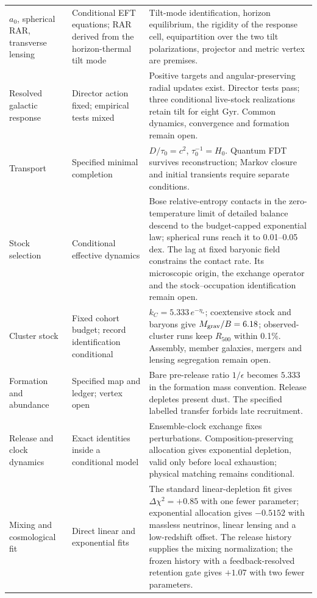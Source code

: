 \documentclass[11pt]{article}
\begin{document}
\begin{longtable}{L{0.24\textwidth}L{0.22\textwidth}L{0.47\textwidth}}
$a_0$, spherical RAR, transverse lensing & Conditional EFT equations; RAR derived from the horizon-thermal tilt mode & Tilt-mode identification, horizon equilibrium, the rigidity of the response cell, equipartition over the two tilt polarizations, projector and metric vertex are premises.\\
Resolved galactic response & Director action fixed; empirical tests mixed & Positive targets and angular-preserving radial updates exist. Director tests pass; three conditional live-stock realizations retain tilt for eight Gyr. Common dynamics, convergence and formation remain open.\\
Transport & Specified minimal completion & $D/\tau_0=c^2$, $\tau_0^{-1}=H_0$. Quantum FDT survives reconstruction; Markov closure and initial transients require separate conditions.\\
Stock selection & Conditional effective dynamics & Bose relative-entropy contacts in the zero-temperature limit of detailed balance descend to the budget-capped exponential law; spherical runs reach it to 0.01--0.05\,dex. The lag at fixed baryonic field constrains the contact rate. Its microscopic origin, the exchange operator and the stock--occupation identification remain open.\\
Cluster stock & Fixed cohort budget; record identification conditional & $k_C=5.333\,e^{-\eta_*}$; coextensive stock and baryons give $M_{\rm grav}/B=6.18$; observed-cluster runs keep $R_{500}$ within 0.1\%. Assembly, member galaxies, mergers and lensing segregation remain open.\\
Formation and abundance & Specified map and ledger; vertex open & Bare pre-release ratio $1/\epsilon$ becomes $5.333$ in the formation mass convention. Release depletes present dust. The specified labelled transfer forbids late recruitment.\\
Release and clock dynamics & Exact identities inside a conditional model & Ensemble-clock exchange fixes perturbations. Composition-preserving allocation gives exponential depletion, valid only before local exhaustion; physical matching remains conditional.\\
Mixing and cosmological fit & Direct linear and exponential fits & The standard linear-depletion fit gives $\Delta\chi^2=+0.85$ with one fewer parameter; exponential allocation gives $-0.5152$ with massless neutrinos, linear lensing and a low-redshift offset. The release history supplies the mixing normalization; the frozen history with a feedback-resolved retention gate gives $+1.07$ with two fewer parameters.\\

\end{longtable}
\end{document}
